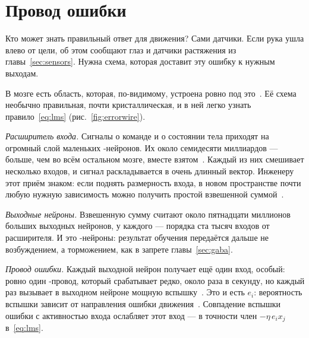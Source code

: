 \section{Провод ошибки}

Кто может знать правильный ответ для движения? Сами датчики. Если рука ушла влево от цели, об этом сообщают глаз и датчики растяжения из главы~\ref{sec:sensors}. Нужна схема, которая доставит эту ошибку к нужным выходам.

В мозге есть область, которая, по-видимому, устроена ровно под это~\cite{Marr1969,Albus1971}. Её схема необычно правильная, почти кристаллическая, и в ней легко узнать правило~\eqref{eq:lms} (рис.~\ref{fig:errorwire}).

\emph{Расширитель входа.} Сигналы о команде и о состоянии тела приходят на огромный слой маленьких -нейронов. Их около семидесяти миллиардов --- больше, чем во всём остальном мозге, вместе взятом~\cite{Azevedo2009}. Каждый из них смешивает несколько входов, и сигнал раскладывается в очень длинный вектор. Инженеру этот приём знаком: если поднять размерность входа, в новом пространстве почти любую нужную зависимость можно получить простой взвешенной суммой~\cite{Cover1965}.

\emph{Выходные нейроны.} Взвешенную сумму считают около пятнадцати миллионов больших выходных нейронов, у каждого --- порядка ста тысяч входов от расширителя. И это -нейроны: результат обучения передаётся дальше не возбуждением, а торможением, как в запрете главы~\ref{sec:gaba}.

\emph{Провод ошибки.} Каждый выходной нейрон получает ещё один вход, особый: ровно один -провод, который срабатывает редко, около раза в секунду, но каждый раз вызывает в выходном нейроне мощную вспышку~\cite{Ito2001}. Это и есть $e_i$: вероятность вспышки зависит от направления ошибки движения~\cite{Herzfeld2018}. Совпадение вспышки ошибки с активностью входа ослабляет этот вход --- в точности член $-\eta\,e_i x_j$ в~\eqref{eq:lms}.

